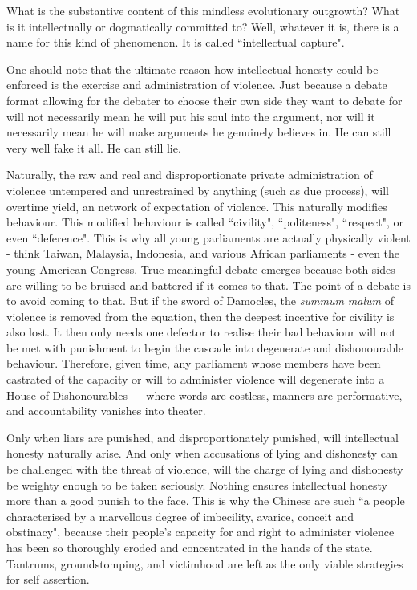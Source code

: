 \begin{itemize}
What is the substantive content of this mindless evolutionary outgrowth? What is it intellectually or dogmatically committed to? Well, whatever it is, there is a name for this kind of phenomenon. It is called “intellectual capture".

One should note that the ultimate reason how intellectual honesty could be enforced is the exercise and administration of violence. Just because a debate format allowing for the debater to choose their own side they want to debate for will not necessarily mean he will put his soul into the argument, nor will it necessarily mean he will make arguments he genuinely believes in. He can still very well fake it all. He can still lie. 

Naturally, the raw and real and disproportionate private administration of violence untempered and unrestrained by anything (such as due process), will overtime yield, an network of expectation of violence. This naturally modifies behaviour. This modified behaviour is called “civility", “politeness", “respect", or even “deference". This is why all young parliaments are actually physically violent - think Taiwan, Malaysia, Indonesia, and various African parliaments - even the young American Congress. True meaningful debate emerges because both sides are willing to be bruised and battered if it comes to that. The point of a debate is to avoid coming to that. But if the sword of Damocles, the \textit{summum malum} of violence is removed from the equation, then the deepest incentive for civility is also lost. It then only needs one defector to realise their bad behaviour will not be met with punishment to begin the cascade into degenerate and dishonourable behaviour. Therefore, given time, any parliament whose members have been castrated of the capacity or will to administer violence will degenerate into a House of Dishonourables — where words are costless, manners are performative, and accountability vanishes into theater.

Only when liars are punished, and disproportionately punished, will intellectual honesty naturally arise. And only when accusations of lying and dishonesty can be challenged with the threat of violence, will the charge of lying and dishonesty be weighty enough to be taken seriously. Nothing ensures intellectual honesty more than a good punish to the face. This is why the Chinese are such “a people characterised by a marvellous degree of imbecility, avarice, conceit and obstinacy", because their people's capacity for and right to administer violence has been so thoroughly eroded and concentrated in the hands of the state. Tantrums, groundstomping, and victimhood are left as the only viable strategies for self assertion.


\end{itemize}
